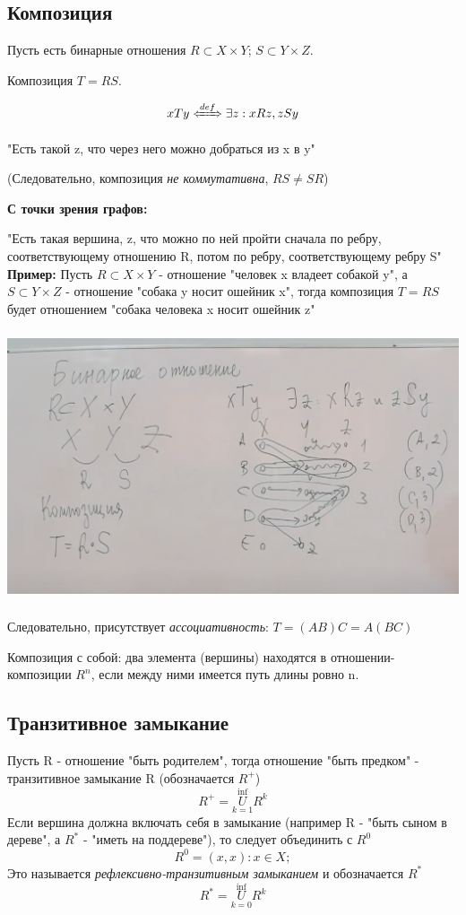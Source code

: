 \subsection{Композиция}
Пусть есть бинарные отношения $ R \subset X \times Y $; $ S \subset Y \times Z $.

Композиция $T = RS$. 


$$ xTy \defLeftrightarrow \exists z : xRz, zSy $$

"Есть такой z, что через него можно добраться из x в y"

(Следовательно, композиция \textit{не коммутативна}, $ RS \neq SR $)

\textbf{С точки зрения графов:}

"Есть такая вершина, z, что можно по ней пройти сначала по ребру, соответствующему отношению R, потом по ребру, соответствующему ребру S"
\textbf{Пример:} 
Пусть $ R \subset X\times Y$ - отношение "человек x владеет собакой y", а $ S \subset Y\times Z$ - отношение "собака y носит ошейник x", тогда композиция $T=RS$ будет отношением "собака человека x носит ошейник z"
\begin{center}
  \includegraphics[height=8cm]{assets/2-1-1.png}
\end{center}
Следовательно, присутствует \textit{ассоциативность}: $ T = (AB)C = A(BC) $

Композиция с собой: два элемента (вершины) находятся в отношении-композиции $ R^{n} $, если между ними имеется путь длины ровно n.

\subsection{Транзитивное замыкание} 
Пусть R - отношение "быть родителем", тогда отношение "быть предком" - транзитивное замыкание R (обозначается $ R^{+} $)
\[R^{+} = \overset{\inf}{\underset{k=1}{U}}R^{k}\]
Если вершина должна включать себя в замыкание (например R - "быть сыном в дереве", а $R^{*}$ - "иметь на поддереве"), то следует объединить с $R^{0}$
\[R^{0} = (x, x): x \in X; \]
Это называется \textit{рефлексивно-транзитивным замыканием} и обозначается $R^{*}$
\[R^{*} = \overset{\inf}{\underset{k=0}{U}}R^{k}\]

